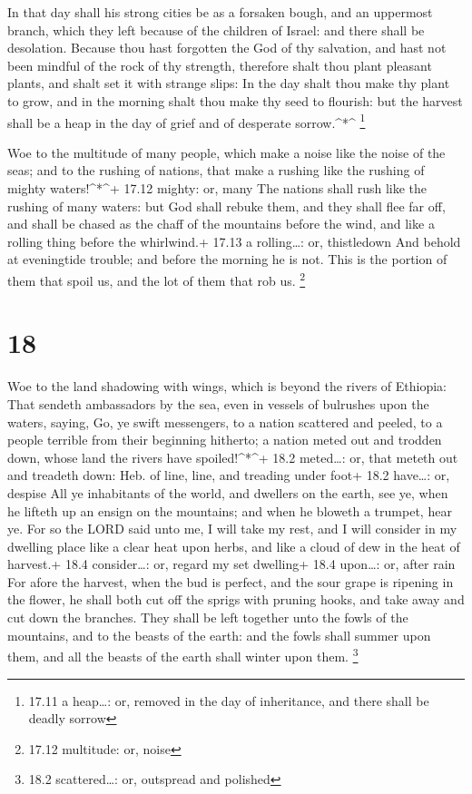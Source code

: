  In that day shall his strong cities be as a forsaken bough,
and an uppermost branch, which they left because of the children of
Israel: and there shall be desolation.  Because thou hast
forgotten the God of thy salvation, and hast not been mindful of the
rock of thy strength, therefore shalt thou plant pleasant plants, and
shalt set it with strange slips:  In the day shalt thou
make thy plant to grow, and in the morning shalt thou make thy seed to
flourish: but the harvest shall be a heap in the day of grief and of
desperate sorrow.\^{}*\^{} \footnote{17.11 a heap\ldots: or, removed in
  the day of inheritance, and there shall be deadly sorrow}

 Woe to the multitude of many people, which make a noise
like the noise of the seas; and to the rushing of nations, that make a
rushing like the rushing of mighty waters!\^{}*\^{}+ 17.12 mighty: or,
many  The nations shall rush like the rushing of many
waters: but God shall rebuke them, and they shall flee far off, and
shall be chased as the chaff of the mountains before the wind, and like
a rolling thing before the whirlwind.+ 17.13 a rolling\ldots: or,
thistledown  And behold at eveningtide trouble; and before
the morning he is not. This is the portion of them that spoil us, and
the lot of them that rob us. \footnote{17.12 multitude: or, noise}

\hypertarget{section-17}{%
\section{18}\label{section-17}}

 Woe to the land shadowing with wings, which is beyond the
rivers of Ethiopia:  That sendeth ambassadors by the sea,
even in vessels of bulrushes upon the waters, saying, Go, ye swift
messengers, to a nation scattered and peeled, to a people terrible from
their beginning hitherto; a nation meted out and trodden down, whose
land the rivers have spoiled!\^{}*\^{}+ 18.2 meted\ldots: or, that
meteth out and treadeth down: Heb. of line, line, and treading under
foot+ 18.2 have\ldots: or, despise  All ye inhabitants of
the world, and dwellers on the earth, see ye, when he lifteth up an
ensign on the mountains; and when he bloweth a trumpet, hear ye.
 For so the LORD said unto me, I will take my rest, and I
will consider in my dwelling place like a clear heat upon herbs, and
like a cloud of dew in the heat of harvest.+ 18.4 consider\ldots: or,
regard my set dwelling+ 18.4 upon\ldots: or, after rain  For
afore the harvest, when the bud is perfect, and the sour grape is
ripening in the flower, he shall both cut off the sprigs with pruning
hooks, and take away and cut down the branches.  They shall
be left together unto the fowls of the mountains, and to the beasts of
the earth: and the fowls shall summer upon them, and all the beasts of
the earth shall winter upon them. \footnote{18.2 scattered\ldots: or,
  outspread and polished}

